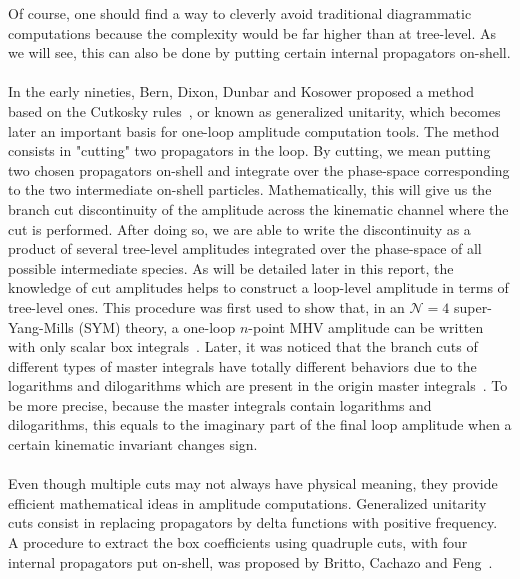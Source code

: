 Of course, one should find a way to cleverly avoid traditional diagrammatic computations because the complexity would be far higher than at tree-level.
As we will see, this can also be done by putting certain internal propagators on-shell.
\\\\
In the early nineties, Bern, Dixon, Dunbar and Kosower proposed a method~\cite{Bern:1994zx} based on the Cutkosky rules~\cite{doi:10.1063/1.1703676}, or known as generalized unitarity, 
which becomes later an important basis for one-loop amplitude computation tools.
The method consists in "cutting" two propagators in the loop.
By cutting, we mean putting two chosen propagators on-shell and integrate over the phase-space corresponding to the two intermediate on-shell particles.
Mathematically, this will give us the branch cut discontinuity of the amplitude across the kinematic channel where the cut is performed. 
After doing so, we are able to write the discontinuity as a product of several tree-level amplitudes integrated over the phase-space of all possible intermediate species.
As will be detailed later in this report, the knowledge of cut amplitudes helps to construct a loop-level amplitude in terms of tree-level ones. 
This procedure was first used to show that, in an $\mathcal{N}=4$ super-Yang-Mills (SYM) theory, a one-loop $n$-point MHV amplitude can be written with only scalar box integrals~\cite{Bern:1994zx}.
Later, it was noticed that the branch cuts of different types of master integrals have totally different behaviors due to the logarithms and dilogarithms which are present in the origin master integrals~\cite{Bern:1994cg}. 
To be more precise, because the master integrals contain logarithms and dilogarithms, this equals to the imaginary part of the final loop amplitude when a certain kinematic invariant changes sign.
\\\\
Even though multiple cuts may not always have physical meaning, they provide efficient mathematical ideas in amplitude computations.
Generalized unitarity cuts consist in replacing propagators by delta functions with positive frequency.
A procedure to extract the box coefficients using quadruple cuts, \ie with four internal propagators put on-shell, was proposed by Britto, Cachazo and Feng~\cite{Britto:2004nc}. 
